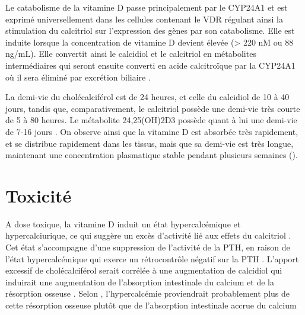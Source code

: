 \documentclass[
  a4paper,
  DIV=11,
  numbers=noendperiod,
  listof=totoc]{scrreprt}
\begin{document}
Le catabolisme de la vitamine D passe principalement par le \ac{CYP24A1}
et est exprimé universellement dans les cellules contenant le \ac{VDR}
régulant ainsi la stimulation du calcitriol sur l'expression des gènes
par son catabolisme. Elle est induite lorsque la concentration de
vitamine D devient élevée (\textgreater{} 220 nM ou 88 ng/mL). Elle
convertit ainsi le calcidiol et le calcitriol en métabolites
intermédiaires qui seront ensuite converti en acide calcitroïque par la
\ac{CYP24A1} où il sera éliminé par excrétion biliaire
\autocite{Schoenmakers.2018,Prosser.2004}.

La demi-vie du cholécalciférol est de 24 heures, et celle du calcidiol
de 10 à 40 jours, tandis que, comparativement, le calcitriol possède une
demi-vie très courte de 5 à 80 heures. Le métabolite \ac{24,25(OH)2D3}
possède quant à lui une demi-vie de 7-16 jours
\autocite{Schoenmakers.2018}. On observe ainsi que la vitamine D est
absorbée très rapidement, et se distribue rapidement dans les tissus,
mais que sa demi-vie est très longue, maintenant une concentration
plasmatique stable pendant plusieurs semaines ().

\section{Toxicité}\label{toxicituxe9}

A dose toxique, la vitamine D induit un état hypercalcémique et
hypercalciurique, ce qui suggère un excès d'activité lié aux effets du
calcitriol \autocite{Vieth.1990}. Cet état s'accompagne d'une
suppression de l'activité de la \ac{PTH}, en raison de l'état
hypercalcémique qui exerce un rétrocontrôle négatif sur la \ac{PTH}
\autocites[ ]{Marcinowska-Suchowierska.2018}{Dusso.2005}. L'apport
excessif de cholécalciférol serait corrélée à une augmentation de
calcidiol qui induirait une augmentation de l'absorption intestinale du
calcium et de la résorption osseuse \autocite{Jones.2008,IOM.2011}.
Selon \textcite{Shepard.1980}, l'hypercalcémie proviendrait probablement
plus de cette résorption osseuse plutôt que de l'absorption intestinale
accrue du calcium
\end{document}
